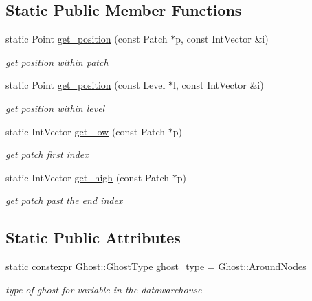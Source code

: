 \subsection*{Static Public Member Functions}
\begin{DoxyCompactItemize}
\item 
static Point \hyperlink{classUintah_1_1PhaseField_1_1detail_1_1dw__interface0_3_01NC_01_4_af7af27e9535e598a1226cb23f64378d5}{get\+\_\+position} (const Patch $\ast$p, const Int\+Vector \&i)
\begin{DoxyCompactList}\small\item\em get position within patch \end{DoxyCompactList}\item 
static Point \hyperlink{classUintah_1_1PhaseField_1_1detail_1_1dw__interface0_3_01NC_01_4_a85da081958a57a02d6a14b2534375a63}{get\+\_\+position} (const Level $\ast$l, const Int\+Vector \&i)
\begin{DoxyCompactList}\small\item\em get position within level \end{DoxyCompactList}\item 
static Int\+Vector \hyperlink{classUintah_1_1PhaseField_1_1detail_1_1dw__interface0_3_01NC_01_4_af9691af5a8683099f6660b3511f85f0c}{get\+\_\+low} (const Patch $\ast$p)
\begin{DoxyCompactList}\small\item\em get patch first index \end{DoxyCompactList}\item 
static Int\+Vector \hyperlink{classUintah_1_1PhaseField_1_1detail_1_1dw__interface0_3_01NC_01_4_a5802f2280d1671d47ba20e6b763bc3bd}{get\+\_\+high} (const Patch $\ast$p)
\begin{DoxyCompactList}\small\item\em get patch past the end index \end{DoxyCompactList}\end{DoxyCompactItemize}
\subsection*{Static Public Attributes}
\begin{DoxyCompactItemize}
\item 
static constexpr Ghost\+::\+Ghost\+Type \hyperlink{classUintah_1_1PhaseField_1_1detail_1_1dw__interface0_3_01NC_01_4_a18732f33999dc6af8676c280847d717a}{ghost\+\_\+type} = Ghost\+::\+Around\+Nodes
\begin{DoxyCompactList}\small\item\em type of ghost for variable in the datawarehouse \end{DoxyCompactList}\end{DoxyCompactItemize}
